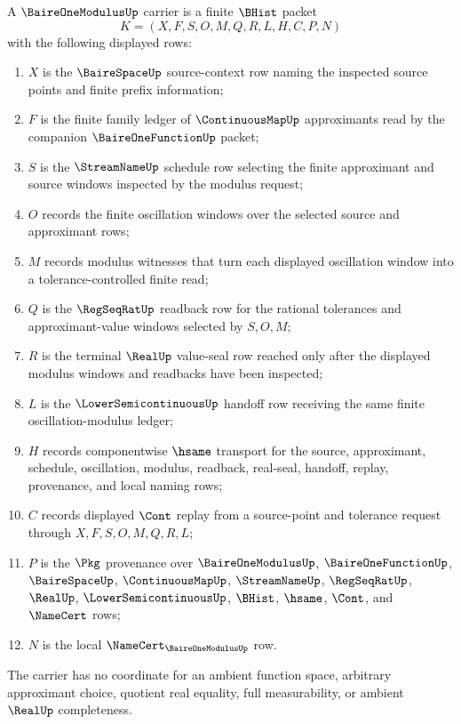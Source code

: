 \begin{definition}
\label{def:baire-one-modulus-carrier}
A $\BaireOneModulusUp$ carrier is a finite $\BHist$ packet
$$
K=(X,F,S,O,M,Q,R,L,H,C,P,N)
$$
with the following displayed rows:
\begin{enumerate}
\item $X$ is the $\BaireSpaceUp$ source-context row naming the inspected source points and finite prefix information;
\item $F$ is the finite family ledger of $\ContinuousMapUp$ approximants read by the companion $\BaireOneFunctionUp$ packet;
\item $S$ is the $\StreamNameUp$ schedule row selecting the finite approximant and source windows inspected by the modulus request;
\item $O$ records the finite oscillation windows over the selected source and approximant rows;
\item $M$ records modulus witnesses that turn each displayed oscillation window into a tolerance-controlled finite read;
\item $Q$ is the $\RegSeqRatUp$ readback row for the rational tolerances and approximant-value windows selected by $S,O,M$;
\item $R$ is the terminal $\RealUp$ value-seal row reached only after the displayed modulus windows and readbacks have been inspected;
\item $L$ is the $\LowerSemicontinuousUp$ handoff row receiving the same finite oscillation-modulus ledger;
\item $H$ records componentwise $\hsame$ transport for the source, approximant, schedule, oscillation, modulus, readback, real-seal, handoff, replay, provenance, and local naming rows;
\item $C$ records displayed $\Cont$ replay from a source-point and tolerance request through $X,F,S,O,M,Q,R,L$;
\item $P$ is the $\Pkg$ provenance over $\BaireOneModulusUp$, $\BaireOneFunctionUp$, $\BaireSpaceUp$, $\ContinuousMapUp$, $\StreamNameUp$, $\RegSeqRatUp$, $\RealUp$, $\LowerSemicontinuousUp$, $\BHist$, $\hsame$, $\Cont$, and $\NameCert$ rows;
\item $N$ is the local $\NameCert_{\BaireOneModulusUp}$ row.
\end{enumerate}
The carrier has no coordinate for an ambient function space, arbitrary approximant choice, quotient real equality, full measurability, or ambient $\RealUp$ completeness.
\end{definition}

